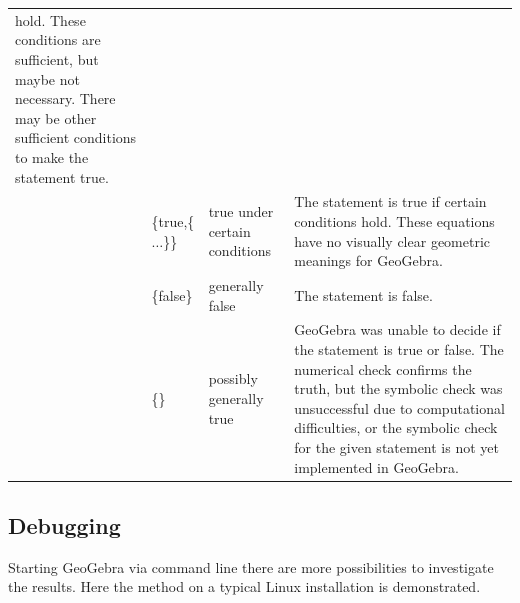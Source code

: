 \documentclass{article}
\begin{document}
\begin{tabular}{|>{\raggedright}m{}|>{\centering}m{}|>{\centering}m{}|>{\centering}m{}|}
{hold. These conditions are sufficient, but maybe not necessary. There
may be other sufficient conditions to make the statement true.}\tabularnewline
\cline{2-4} 
 & {\footnotesize{}\{true,\{$\ldots$\}\}} & {\footnotesize{}true under certain conditions} & {\footnotesize{}The statement is true if certain conditions hold.
These equations have no visually clear geometric meanings for GeoGebra.}\tabularnewline
\cline{2-4} 
 & {\footnotesize{}\{false\}} & {\footnotesize{}generally false} & {\footnotesize{}The statement is false.}\tabularnewline
\cline{2-4} 
 & {\footnotesize{}\{\}} & {\footnotesize{}possibly generally true} & {\footnotesize{}GeoGebra was unable to decide if the statement is
true or false. The numerical check confirms the truth, but the symbolic
check was unsuccessful due to computational difficulties, or the symbolic
check for the given statement is not yet implemented in GeoGebra.}\tabularnewline
\hline 
\end{tabular}


\subsection{Debugging}
Starting GeoGebra via command line there are more possibilities to investigate the results. Here the method on a typical Linux installation is demonstrated.
\end{document}
